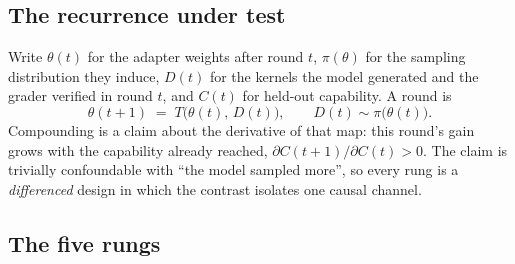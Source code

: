 \subsection{The recurrence under test}

Write $\theta(t)$ for the adapter weights after round $t$, $\pi(\theta)$ for the sampling
distribution they induce, $D(t)$ for the kernels the model generated and the grader verified in
round $t$, and $C(t)$ for held-out capability. A round is
\[
  \theta(t{+}1) \;=\; T\big(\theta(t),\, D(t)\big), \qquad D(t) \sim \pi\big(\theta(t)\big).
\]
Compounding is a claim about the derivative of that map: this round's gain grows with the
capability already reached, $\partial C(t{+}1)/\partial C(t) > 0$. The claim is trivially
confoundable with ``the model sampled more'', so every rung is a \emph{differenced} design in
which the contrast isolates one causal channel.

\subsection{The five rungs}

